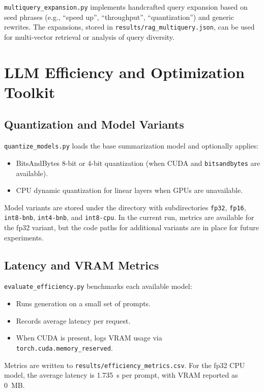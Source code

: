 \documentclass[11pt]{article}
\begin{document}
\verb|multiquery_expansion.py| implements handcrafted query expansion based on seed phrases (e.g., ``speed up'', ``throughput'', ``quantization'') and generic rewrites. The expansions, stored in \verb|results/rag_multiquery.json|, can be used for multi-vector retrieval or analysis of query diversity.

\section{LLM Efficiency and Optimization Toolkit}

\subsection{Quantization and Model Variants}

\verb|quantize_models.py| loads the base summarization model and optionally applies:

\begin{itemize}[leftmargin=1.5em]
\item BitsAndBytes 8-bit or 4-bit quantization (when CUDA and \verb|bitsandbytes| are available).
\item CPU dynamic quantization for linear layers when GPUs are unavailable.
\end{itemize}

Model variants are stored under the directory  with subdirectories
\texttt{fp32}, \texttt{fp16}, \texttt{int8-bnb}, \texttt{int4-bnb}, and \texttt{int8-cpu}. In the
current run, metrics are available for the fp32 variant, but the code paths for additional
variants are in place for future experiments.

\subsection{Latency and VRAM Metrics}

\verb|evaluate_efficiency.py| benchmarks each available model:

\begin{itemize}[leftmargin=1.5em]
\item Runs generation on a small set of prompts.
\item Records average latency per request.
\item When CUDA is present, logs VRAM usage via \verb|torch.cuda.memory_reserved|.
\end{itemize}

Metrics are written to \verb|results/efficiency_metrics.csv|. For the fp32 CPU model, the average latency is 1.735~s per prompt, with VRAM reported as 0~MB.
\end{document}
